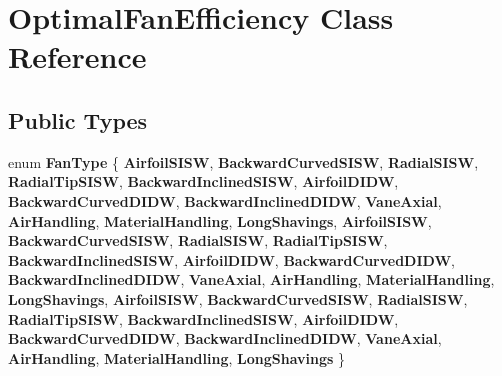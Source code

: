 \hypertarget{class_optimal_fan_efficiency}{}\section{Optimal\+Fan\+Efficiency Class Reference}
\label{class_optimal_fan_efficiency}
\subsection*{Public Types}
\begin{DoxyCompactItemize}
\item 
\mbox{\label{class_optimal_fan_efficiency_a468d7943ddcfc8678373762cd0641823}} 
enum {\bfseries Fan\+Type} \{ \newline
{\bfseries Airfoil\+S\+I\+SW}, 
{\bfseries Backward\+Curved\+S\+I\+SW}, 
{\bfseries Radial\+S\+I\+SW}, 
{\bfseries Radial\+Tip\+S\+I\+SW}, 
\newline
{\bfseries Backward\+Inclined\+S\+I\+SW}, 
{\bfseries Airfoil\+D\+I\+DW}, 
{\bfseries Backward\+Curved\+D\+I\+DW}, 
{\bfseries Backward\+Inclined\+D\+I\+DW}, 
\newline
{\bfseries Vane\+Axial}, 
{\bfseries Air\+Handling}, 
{\bfseries Material\+Handling}, 
{\bfseries Long\+Shavings}, 
\newline
{\bfseries Airfoil\+S\+I\+SW}, 
{\bfseries Backward\+Curved\+S\+I\+SW}, 
{\bfseries Radial\+S\+I\+SW}, 
{\bfseries Radial\+Tip\+S\+I\+SW}, 
\newline
{\bfseries Backward\+Inclined\+S\+I\+SW}, 
{\bfseries Airfoil\+D\+I\+DW}, 
{\bfseries Backward\+Curved\+D\+I\+DW}, 
{\bfseries Backward\+Inclined\+D\+I\+DW}, 
\newline
{\bfseries Vane\+Axial}, 
{\bfseries Air\+Handling}, 
{\bfseries Material\+Handling}, 
{\bfseries Long\+Shavings}, 
\newline
{\bfseries Airfoil\+S\+I\+SW}, 
{\bfseries Backward\+Curved\+S\+I\+SW}, 
{\bfseries Radial\+S\+I\+SW}, 
{\bfseries Radial\+Tip\+S\+I\+SW}, 
\newline
{\bfseries Backward\+Inclined\+S\+I\+SW}, 
{\bfseries Airfoil\+D\+I\+DW}, 
{\bfseries Backward\+Curved\+D\+I\+DW}, 
{\bfseries Backward\+Inclined\+D\+I\+DW}, 
\newline
{\bfseries Vane\+Axial}, 
{\bfseries Air\+Handling}, 
{\bfseries Material\+Handling}, 
{\bfseries Long\+Shavings}
 \}
\item 
\mbox{\label{class_optimal_fan_efficiency_a468d7943ddcfc8678373762cd0641823}} 

\end{DoxyCompactItemize}
